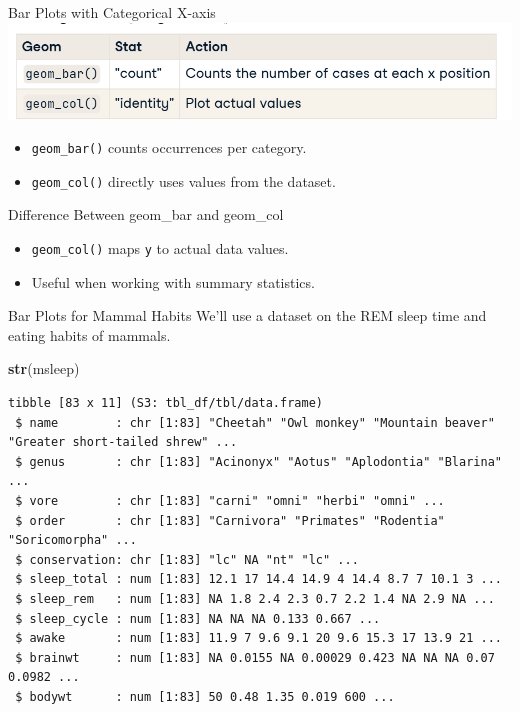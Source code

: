 \documentclass[
  ignorenonframetext,
]{beamer}
\newenvironment{Shaded}{\begin{snugshade}}{\end{snugshade}}
\newcommand{\FunctionTok}[1]{\textcolor[rgb]{0.13,0.29,0.53}{\textbf{#1}}}
\newcommand{\NormalTok}[1]{#1}
\providecommand{\tightlist}{%
  \setlength{\itemsep}{0pt}\setlength{\parskip}{0pt}}
\begin{document}
\begin{frame}[fragile]{Bar Plots with Categorical X-axis}
\label{bar-plots-with-categorical-x-axis}
\includegraphics{../images/im207.png}

\begin{itemize}
\tightlist
\item
  \texttt{geom\_bar()} counts occurrences per category.
\item
  \texttt{geom\_col()} directly uses values from the dataset.
\end{itemize}
\end{frame}

\begin{frame}[fragile]{Difference Between geom\_bar and geom\_col}
\label{difference-between-geom_bar-and-geom_col}
\begin{itemize}
\tightlist
\item
  \texttt{geom\_col()} maps \texttt{y} to actual data values.
\item
  Useful when working with summary statistics.
\end{itemize}
\end{frame}

\begin{frame}[fragile]{Bar Plots for Mammal Habits}
\label{bar-plots-for-mammal-habits}
We'll use a dataset on the REM sleep time and eating habits of mammals.

\begin{Shaded}
\begin{Highlighting}[]
\FunctionTok{str}\NormalTok{(msleep)}
\end{Highlighting}
\end{Shaded}

\begin{verbatim}
tibble [83 x 11] (S3: tbl_df/tbl/data.frame)
 $ name        : chr [1:83] "Cheetah" "Owl monkey" "Mountain beaver" "Greater short-tailed shrew" ...
 $ genus       : chr [1:83] "Acinonyx" "Aotus" "Aplodontia" "Blarina" ...
 $ vore        : chr [1:83] "carni" "omni" "herbi" "omni" ...
 $ order       : chr [1:83] "Carnivora" "Primates" "Rodentia" "Soricomorpha" ...
 $ conservation: chr [1:83] "lc" NA "nt" "lc" ...
 $ sleep_total : num [1:83] 12.1 17 14.4 14.9 4 14.4 8.7 7 10.1 3 ...
 $ sleep_rem   : num [1:83] NA 1.8 2.4 2.3 0.7 2.2 1.4 NA 2.9 NA ...
 $ sleep_cycle : num [1:83] NA NA NA 0.133 0.667 ...
 $ awake       : num [1:83] 11.9 7 9.6 9.1 20 9.6 15.3 17 13.9 21 ...
 $ brainwt     : num [1:83] NA 0.0155 NA 0.00029 0.423 NA NA NA 0.07 0.0982 ...
 $ bodywt      : num [1:83] 50 0.48 1.35 0.019 600 ...
\end{verbatim}
\end{frame}
\end{document}
